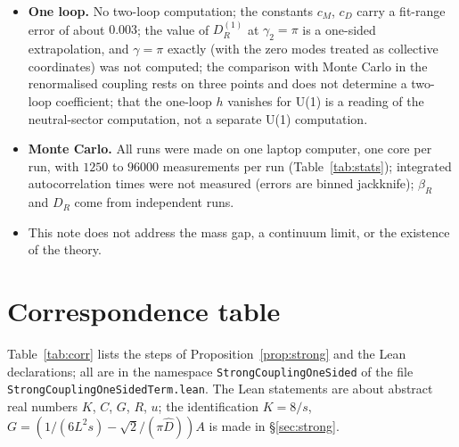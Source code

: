 \documentclass[11pt,a4paper]{article}
\theoremstyle{definition}
\theoremstyle{remark}
\newcommand{\bR}{\beta_R}
\newcommand{\DR}{D_R}
\begin{document}
\begin{itemize}[leftmargin=2em]
\item \textbf{One loop.} No two-loop computation; the constants $c_M$, $c_D$ carry a fit-range error of about $0.003$; the value of $\DR^{(1)}$ at $\gamma_2=\pi$ is a one-sided extrapolation, and $\gamma=\pi$ exactly (with the zero modes treated as collective coordinates) was not computed; the comparison with Monte Carlo in the renormalised coupling rests on three points and does not determine a two-loop coefficient; that the one-loop $h$ vanishes for U(1) is a reading of the neutral-sector computation, not a separate U(1) computation.
\item \textbf{Monte Carlo.} All runs were made on one laptop computer, one core per run, with $1250$ to $96000$ measurements per run (Table~\ref{tab:stats}); integrated autocorrelation times were not measured (errors are binned jackknife); $\bR$ and $\DR$ come from independent runs.
\item This note does not address the mass gap, a continuum limit, or the existence of the theory.
\end{itemize}

\section{Correspondence table}\label{sec:corr}

Table~\ref{tab:corr} lists the steps of Proposition~\ref{prop:strong} and the Lean declarations; all are in the namespace \texttt{StrongCouplingOneSided} of the file \texttt{StrongCouplingOneSidedTerm.lean}. The Lean statements are about abstract real numbers $K$, $C$, $G$, $R$, $u$; the identification $K=8/s$, $G=(1/(6L^2s)-\sqrt2/(\pi\hat D))A$ is made in \S\ref{sec:strong}.
\end{document}
